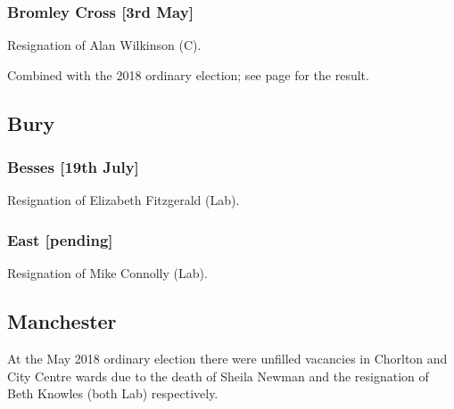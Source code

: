\documentclass[a4paper,openany]{book}
\begin{document}
\begin{resultsiii}
\subsubsection*{Bromley Cross \hspace*{\fill}\nolinebreak[1]%
\enspace\hspace*{\fill}
[3rd May]}


Resignation of Alan Wilkinson (C).

Combined with the 2018 ordinary election; see page \pageref{BromleyCrossBolton} for the result.

\subsection*{Bury}

\subsubsection*{Besses \hspace*{\fill}\nolinebreak[1]%
\enspace\hspace*{\fill}
[19th July]}


Resignation of Elizabeth Fitzgerald (Lab).

\subsubsection*{East \hspace*{\fill}\nolinebreak[1]%
\enspace\hspace*{\fill}
[pending]}


Resignation of Mike Connolly (Lab).

\subsection*{Manchester}

At the May 2018 ordinary election there were unfilled vacancies in Chorlton and City Centre wards due to the death of Sheila Newman and the resignation of Beth Knowles (both Lab) respectively.


\end{resultsiii}
\end{document}
